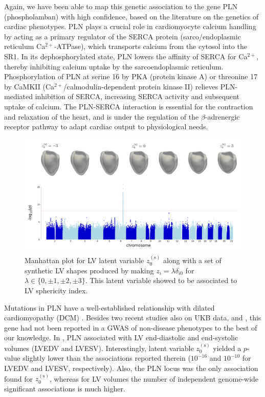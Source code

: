 Again, we have been able to map this genetic association to the gene PLN (phospholamban) with high confidence, based on the literature on the genetics of cardiac phenotypes.
PLN plays a crucial role in cardiomyocyte calcium handling by acting as a primary regulator of the SERCA protein (sarco/endoplasmic reticulum Ca$^{2+}$-ATPase), which transports calcium from the cytosol into the SR1. In its dephosphorylated state, PLN lowers the affinity of SERCA for Ca$^{2+}$, thereby inhibiting calcium uptake by the sarcoendoplasmic reticulum. Phosphorylation of PLN at serine 16 by PKA (protein kinase A) or threonine 17 by CaMKII (Ca$^{2+}$/calmodulin-dependent protein kinase II) relieves PLN-mediated inhibition of SERCA, increasing SERCA activity and subsequent uptake of calcium. The PLN-SERCA interaction is essential for the contraction and relaxation of the heart, and is under the regulation of the $\beta$-adrenergic receptor pathway to adapt cardiac output to physiological needs. \cite{maclennan_2003}

\begin{figure}[ht!]
\includegraphics[width=\textwidth]{figs/gwas/GWAS_Experiment1_z0s_scaled_meshes.png}
\caption{Manhattan plot for LV latent variable $z_0^{(\text{s})}$ along with a set of synthetic LV shapes produced by making $z_i=\lambda \delta_{i0}$ for $\lambda\in\{0, \pm 1, \pm 2, \pm 3\}$. This latent variable showed to be associated to LV sphericity index.}
\label{fig:manhattan_LV_latent}
\end{figure}

Mutations in PLN have a well-established relationship with dilated cardiomyopathy (DCM) \cite{ref_Eijgenraam}. Besides two recent studies also on UKB data, \cite{ref_pirruccello} and \cite{ref_fractal_dim}, this gene had not been reported in a GWAS of non-disease phenotypes to the best of our knowledge. In \cite{ref_pirruccello}, PLN associated with LV end-diastolic and end-systolic volumes (LVEDV and LVESV). Interestingly, latent variable $z_0^{(\text{s})}$ yielded a $p$-value slightly lower than the associations reported therein ($10^{-16}$ and $10^{-10}$ for LVEDV and LVESV, respectively). Also, the PLN locus was the only association found for $z_0^{(\text{s})}$, whereas for LV volumes the number of independent genome-wide significant associations is much higher. 

